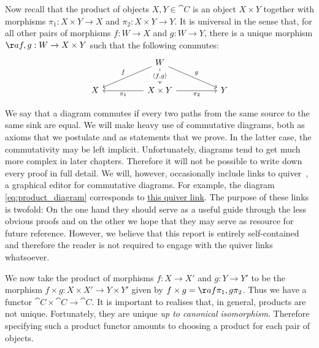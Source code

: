 Now recall that the product of objects $X,Y\in\cat{C}$ is an object $X\times Y$
together with morphisms $\pi_1 : X\times Y \to X$ and $\pi_2 : X\times Y \to
Y$. It is universal in the sense that, for all other pairs of morphisms $f:W\to
X$ and $g:W\to Y$, there is a unique morphism $\aa{f,g}:W\to X\times Y$ such
that the following commutes:
\begin{equation}\label{eq:product_diagram}
  \begin{tikzcd}
  && W \\
    X && {X\times Y} && Y
    \arrow["{\pi_2}"', from=2-3, to=2-5]
    \arrow["{\pi_1}", from=2-3, to=2-1]
    \arrow["{\langle f,g\rangle}"{description}, from=1-3, to=2-3]
    \arrow["f"', from=1-3, to=2-1]
    \arrow["g", from=1-3, to=2-5]
  \end{tikzcd}
\end{equation}

We say that a diagram commutes if every two paths from the same source to the
same sink are equal. We will make heavy use of commutative diagrams, both as
axioms that we postulate and as statements that we prove. In the latter case,
the commutativity may be left implicit. Unfortunately, diagrams tend to get
much more complex in later chapters. Therefore it will not be possible to write
down every proof in full detail. We will, however, occasionally include links
to quiver~\cite{quiver}, a graphical editor for commutative diagrams. For
example, the diagram \ref{eq:product_diagram} corresponds to \href{
  https://q.uiver.app/?q=WzAsNCxbMiwwLCJXIl0sWzIsMSwiWFxcdGltZXMgWSJdLFswLDEsIlgiXSxbNCwxLCJZIl0sWzEsMywiXFxwaV8yIiwyXSxbMSwyLCJcXHBpXzEiXSxbMCwxLCJcXGxhbmdsZSBmLGdcXHJhbmdsZSIsMV0sWzAsMiwiZiIsMl0sWzAsMywiZyJdXQ==
}{this quiver link}. The purpose of these links is twofold: On the one hand
they should serve as a useful guide through the less obvious proofs and on the
other we hope that they may serve as resource for future reference. However, we
believe that this report is entirely self-contained and therefore the reader is
not required to engage with the quiver links whatsoever.

We now take the product of morphisms $f:X\to X'$ and $g:Y\to Y'$ to be the
morphism $f\times g:X\times X'\to Y\times Y'$ given by $f\times
g=\aa{f\pi_1,g\pi_2}$. Thus we have a functor $\cat{C}\times\cat{C}\to\cat{C}$.
It is important to realises that, in general, products are not unique.
Fortunately, they are unique \emph{up to canonical isomorphism}. Therefore
specifying such a product functor amounts to choosing a product for each pair
of objects.

